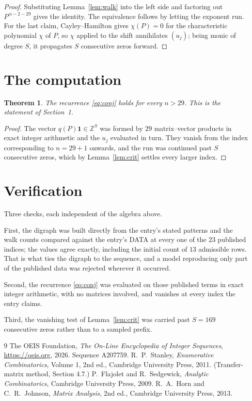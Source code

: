 \documentclass[11pt,a4paper]{article}
\theoremstyle{plain}
\newtheorem{theorem}{Theorem}
\theoremstyle{definition}
\begin{document}
\begin{proof}
Substituting Lemma~\ref{lem:walk} into the left side and factoring out
$P^{\,n-2-29}$ gives the identity. The equivalence follows by letting the exponent
run. For the last claim, Cayley--Hamilton gives $\chi(P)=0$ for the characteristic
polynomial $\chi$ of $P$, so $\chi$ applied to the shift annihilates $(u_j)$; being monic of
degree $S$, it propagates $S$ consecutive zeros forward.
\end{proof}

\section{The computation}

\begin{theorem}
The recurrence \eqref{eq:conj} holds for every $n>29$. This is the statement of
Section~1.
\end{theorem}

\begin{proof}
The vector $q(P)\mathbf{1}\in\mathbb{Z}^{S}$ was formed by $29$ matrix--vector
products in exact integer arithmetic and the $u_j$ evaluated in turn. They vanish from the
index corresponding to $n=29+1$ onwards, and the run was continued past $S$ consecutive
zeros, which by Lemma~\ref{lem:crit} settles every larger index.
\end{proof}

\section{Verification}

Three checks, each independent of the algebra above.

First, the digraph was built directly from the entry's stated patterns and the walk counts
compared against the entry's DATA at every one of the $23$ published indices; the
values agree exactly, including the initial count of $13$ admissible rows. That is
what ties the digraph to the sequence, and a model reproducing only part of the published
data was rejected wherever it occurred.

Second, the recurrence \eqref{eq:conj} was evaluated on those published terms in exact
integer arithmetic, with no matrices involved, and vanishes at every index the entry claims.

Third, the vanishing test of Lemma~\ref{lem:crit} was carried past $S=169$ consecutive
zeros rather than to a sampled prefix.

\begin{thebibliography}{9}
 The OEIS Foundation, \emph{The On-Line Encyclopedia of Integer
Sequences}, \url{https://oeis.org}, 2026. Sequence A207759.
 R.~P.~Stanley, \emph{Enumerative Combinatorics}, Volume 1, 2nd ed.,
Cambridge University Press, 2011. (Transfer-matrix method, Section 4.7.)
 P.~Flajolet and R.~Sedgewick, \emph{Analytic Combinatorics}, Cambridge
University Press, 2009.
 R.~A.~Horn and C.~R.~Johnson, \emph{Matrix Analysis}, 2nd ed., Cambridge
University Press, 2013.
\end{thebibliography}
\end{document}
